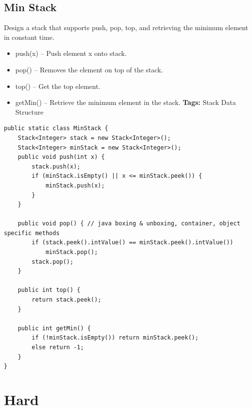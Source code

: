 \documentclass[12pt]{book}
\begin{document}
\subsection{Min Stack}
\label{sec-19-1-2}
Design a stack that supports push, pop, top, and retrieving the minimum element in constant time.
\begin{itemize}
\item push(x) -- Push element x onto stack.
\item pop() -- Removes the element on top of the stack.
\item top() -- Get the top element.
\item getMin() -- Retrieve the minimum element in the stack.
\textbf{Tags:} Stack Data Structure
\end{itemize}
\lstset{language=java,label= ,caption= ,numbers=none}
\begin{lstlisting}
public static class MinStack {
    Stack<Integer> stack = new Stack<Integer>();
    Stack<Integer> minStack = new Stack<Integer>();
    public void push(int x) {
        stack.push(x);
        if (minStack.isEmpty() || x <= minStack.peek()) {
            minStack.push(x);
        }
    }

    public void pop() { // java boxing & unboxing, container, object specific methods
        if (stack.peek().intValue() == minStack.peek().intValue()) 
            minStack.pop();
        stack.pop();
    }

    public int top() {
        return stack.peek();
    }

    public int getMin() {
        if (!minStack.isEmpty()) return minStack.peek();
        else return -1;
    }
}
\end{lstlisting}
\section{Hard}
\label{sec-19-2}
\end{document}
